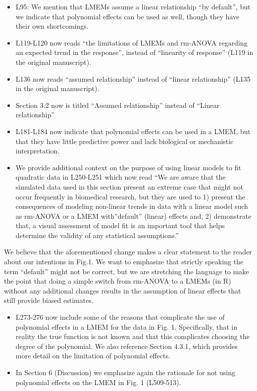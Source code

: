 \documentclass[
]{article}
\begin{document}
\begin{itemize}
\item
  L95: We mention that LMEMs assume a linear relationship ``by default'', but we indicate that polynomial effects can be used as well, though they have their own shortcomings.
\item
  L119-L120 now reads ``the limitations of LMEMs and rm-ANOVA regarding an expected trend in the response'', instead of ``linearity of response'' (L119 in the original manuscript).
\item
  L136 now reads ``assumed relationship'' instead of ``linear relationship'' (L135 in the original manuscript).
\item
  Section 3.2 now is titled ``Assumed relationship'' instead of ``Linear relationship''
\item
  L181-L184 now indicate that polynomial effects can be used in a LMEM, but that they have little predictive power and lack biological or mechanistic interpretation.
\item
  We provide additional context on the purpose of using linear models to fit quadratic data in L250-L251 which now read ``We are aware that the simulated data used in this section present an extreme case that might not occur frequently in biomedical research, but they are used to 1) present the consequences of modeling non-linear trends in data with a linear model such as rm-ANOVA or a LMEM with''default'' (linear) effects and, 2) demonstrate that, a visual assessment of model fit is an important tool that helps determine the validity of any statistical assumptions.''
\end{itemize}

We believe that the aforementioned change makes a clear statement to the reader about our intentions in Fig.1. We want to emphasize that strictly speaking the term ``default'' might not be correct, but we are stretching the language to make the point that doing a simple switch from rm-ANOVA to a LMEMs (in R) without any additional changes results in the assumption of linear effects that still provide biased estimates.

\begin{itemize}
\item
  L273-276 now include some of the reasons that complicate the use of polynomial effects in a LMEM for the data in Fig. 1. Specifically, that in reality the true function is not known and that this complicates choosing the degree of the polynomial. We also reference Section 4.3.1, which provides more detail on the limitation of polynomial effects.
\item
  In Section 6 (Discussion) we emphasize again the rationale for not using polynomial effects on the LMEM in Fig. 1 (L509-513).
\end{itemize}
\end{document}

